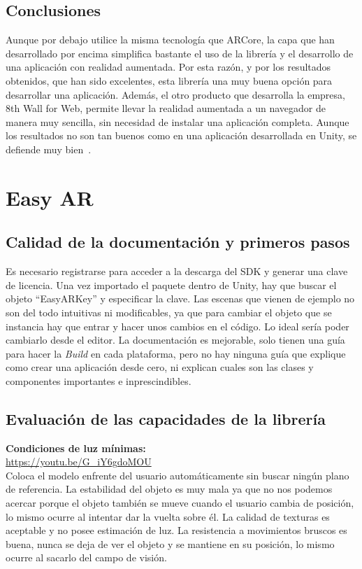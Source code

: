 \subsection{Conclusiones}
Aunque por debajo utilice la misma tecnología que ARCore, la capa que han desarrollado por encima simplifica bastante el uso de la librería y el desarrollo de una aplicación con realidad aumentada. Por esta razón, y por los resultados obtenidos, que han sido excelentes, esta librería una muy buena opción para desarrollar una aplicación. Además, el otro producto que desarrolla la empresa, 8th Wall for Web, permite llevar la realidad aumentada a un navegador de manera muy sencilla, sin necesidad de instalar una aplicación completa. Aunque los resultados no son tan buenos como en una aplicación desarrollada en Unity, se defiende muy bien~\cite{8thWallJini}.

\section{Easy AR}
\subsection{Calidad de la documentación y primeros pasos}
Es necesario registrarse para acceder a la descarga del SDK y generar una clave de licencia. Una vez importado el paquete dentro de Unity, hay que buscar el objeto ``EasyARKey'' y especificar la clave. Las escenas que vienen de ejemplo no son del todo intuitivas ni modificables, ya que para cambiar el objeto que se instancia hay que entrar y hacer unos cambios en el código. Lo ideal sería poder cambiarlo desde el editor. La documentación es mejorable, solo tienen una guía para hacer la \textit{Build} en cada plataforma, pero no hay ninguna guía que explique como crear una aplicación desde cero, ni explican cuales son las clases y componentes importantes e inprescindibles.

\subsection{Evaluación de las capacidades de la librería}
\textbf{Condiciones de luz mínimas:}\\
\url{https://youtu.be/G_iY6gdoMOU}\\

Coloca el modelo enfrente del usuario automáticamente sin buscar ningún plano de referencia. La estabilidad del objeto es muy mala ya que no nos podemos acercar porque el objeto también se mueve cuando el usuario cambia de posición, lo mismo ocurre al intentar dar la vuelta sobre él. La calidad de texturas es aceptable y no posee estimación de luz. La resistencia a movimientos bruscos es buena, nunca se deja de ver el objeto y se mantiene en su posición, lo mismo ocurre al sacarlo del campo de visión.\\


